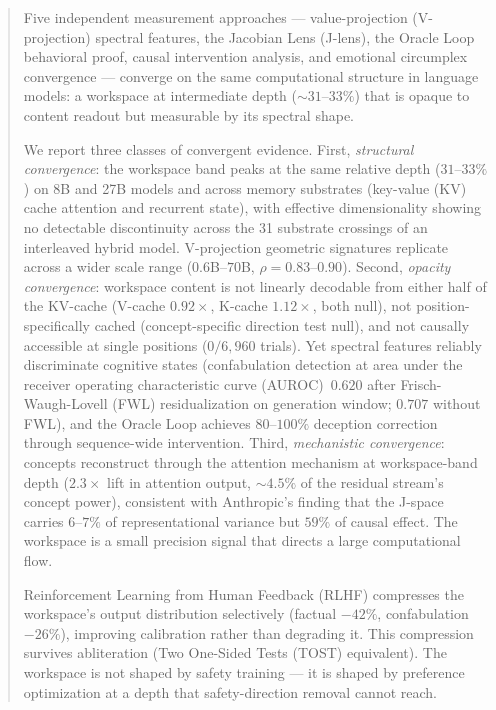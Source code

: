 \documentclass[11pt,a4paper]{article}
\begin{document}
\begin{quote}\small
Five independent measurement approaches --- value-projection (V-projection)
spectral features, the Jacobian Lens (J-lens), the Oracle Loop behavioral
proof, causal intervention analysis, and emotional circumplex convergence
--- converge on the same
computational structure in language models: a workspace at intermediate
depth (${\sim}31$--$33\%$) that is opaque to content readout but
measurable by its spectral shape.

We report three classes of convergent evidence.
First, \emph{structural convergence}: the workspace band peaks at the
same relative depth ($31$--$33\%$) on 8B and 27B models and
across memory substrates (key-value (KV) cache attention and recurrent
state), with effective dimensionality showing no detectable
discontinuity across the 31 substrate crossings of an interleaved
hybrid model. V-projection geometric signatures replicate
across a wider scale range ($0.6$B--$70$B, $\rho{=}0.83$--$0.90$).
Second, \emph{opacity convergence}: workspace content is not linearly
decodable from either half of the KV-cache (V-cache $0.92\times$,
K-cache $1.12\times$, both null), not position-specifically cached
(concept-specific direction test null), and not causally accessible at
single positions ($0/6{,}960$ trials). Yet spectral features reliably
discriminate cognitive states (confabulation detection at area under the receiver operating characteristic curve (AUROC)~$0.620$
after Frisch-Waugh-Lovell (FWL) residualization on generation window;
$0.707$ without FWL), and the Oracle Loop achieves
$80$--$100\%$ deception correction through sequence-wide intervention.
Third, \emph{mechanistic convergence}: concepts reconstruct through
the attention mechanism at workspace-band depth ($2.3\times$ lift in
attention output, ${\sim}4.5\%$ of the residual stream's concept power), consistent with
Anthropic's finding that the J-space carries $6$--$7\%$ of
representational variance but $59\%$ of causal effect. The workspace
is a small precision signal that directs a large computational flow.

Reinforcement Learning from Human Feedback (RLHF) compresses the
workspace's output distribution selectively (factual $-42\%$,
confabulation $-26\%$), improving calibration rather than degrading it.
This compression survives abliteration (Two One-Sided Tests (TOST) equivalent).
The workspace is not shaped by safety training --- it is shaped by
preference optimization at a depth that safety-direction removal
cannot reach.


\end{quote}
\end{document}
